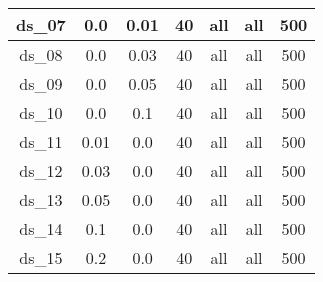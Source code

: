 \begin{table}[H]
\begin{tabular}{|c|c|c|c|c|c|c|}
ds\_07                              & 0.0                                             & 0.01                                           & 40                                      & all                                   & all                                    & 500                                     \\ \hline
ds\_08                              & 0.0                                             & 0.03                                           & 40                                      & all                                   & all                                    & 500                                     \\ \hline
ds\_09                              & 0.0                                             & 0.05                                           & 40                                      & all                                   & all                                    & 500                                     \\ \hline
ds\_10                              & 0.0                                             & 0.1                                            & 40                                      & all                                   & all                                    & 500                                     \\ \hline
ds\_11                              & 0.01                                            & 0.0                                            & 40                                      & all                                   & all                                    & 500                                     \\ \hline
ds\_12                              & 0.03                                            & 0.0                                            & 40                                      & all                                   & all                                    & 500                                     \\ \hline
ds\_13                              & 0.05                                            & 0.0                                            & 40                                      & all                                   & all                                    & 500                                     \\ \hline
ds\_14                              & 0.1                                             & 0.0                                            & 40                                      & all                                   & all                                    & 500                                     \\ \hline
ds\_15                              & 0.2                                             & 0.0                                            & 40                                      & all                                   & all                                    & 500                                     \\ \hline
\end{tabular}
\end{table}


